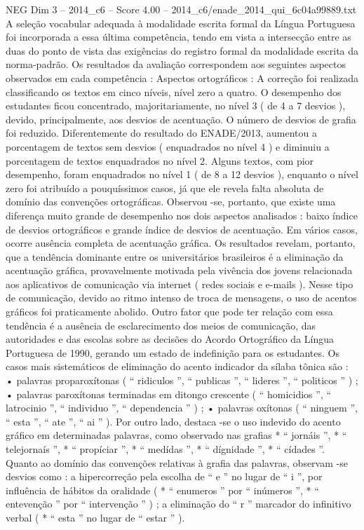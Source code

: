 \begin{textsample}{NEG Dim 3 – 2014\_c6 – Score 4.00 – 2014\_c6/enade\_2014\_qui\_6c04a99889.txt}
A seleção vocabular adequada à modalidade escrita formal da Língua Portuguesa foi incorporada a essa última competência, tendo em vista a intersecção entre as duas do ponto de vista das exigências do registro formal da modalidade escrita da norma-padrão.
Os resultados da avaliação correspondem aos seguintes aspectos observados em cada competência : Aspectos ortográficos : A correção foi realizada classificando os textos em cinco níveis, nível zero a quatro.
O desempenho dos estudantes ficou concentrado, majoritariamente, no nível 3 ( de 4 a 7 desvios ), devido, principalmente, aos desvios de acentuação.
O número de desvios de grafia foi reduzido.
Diferentemente do resultado do ENADE/2013, aumentou a porcentagem de textos sem desvios ( enquadrados no nível 4 ) e diminuiu a porcentagem de textos enquadrados no nível 2.
Alguns textos, com pior desempenho, foram enquadrados no nível 1 ( de 8 a 12 desvios ), enquanto o nível zero foi atribuído a pouquíssimos casos, já que ele revela falta absoluta de domínio das convenções ortográficas.
Observou -se, portanto, que existe uma diferença muito grande de desempenho nos dois aspectos analisados : baixo índice de desvios ortográficos e grande índice de desvios de acentuação.
Em vários casos, ocorre ausência completa de acentuação gráfica.
Os resultados revelam, portanto, que a tendência dominante entre os universitários brasileiros é a eliminação da acentuação gráfica, provavelmente motivada pela vivência dos jovens relacionada aos aplicativos de comunicação via internet ( redes sociais e e-mails ).
Nesse tipo de comunicação, devido ao ritmo intenso de troca de mensagens, o uso de acentos gráficos foi praticamente abolido.
Outro fator que pode ter relação com essa tendência é a ausência de esclarecimento dos meios de comunicação, das autoridades e das escolas sobre as decisões do Acordo Ortográfico da Língua Portuguesa de 1990, gerando um estado de indefinição para os estudantes.
Os casos mais sistemáticos de eliminação do acento indicador da sílaba tônica são : • palavras proparoxítonas ( “ ridiculos ”, “ publicas ”, “ lideres ”, “ politicos ” ) ; • palavras paroxítonas terminadas em ditongo crescente ( “ homicidios ”, “ latrocinio ”, “ individuo ”, “ dependencia ” ) ; • palavras oxítonas ( “ ninguem ”, “ esta ”, “ ate ”, “ ai ” ).
Por outro lado, destaca -se o uso indevido do acento gráfico em determinadas palavras, como observado nas grafias * “ jornáis ”, * “ telejornaís ”, * “ propíciar ”, * “ medídas ”, * “ dígnidade ”, * “ cídades ”.
Quanto ao domínio das convenções relativas à grafia das palavras, observam -se desvios como : a hipercorreção pela escolha de “ e ” no lugar de “ i ”, por influência de hábitos da oralidade ( * “ enumeros ” por “ inúmeros ”, * “ entevenção ” por “ intervenção ” ) ; a eliminação do “ r ” marcador do infinitivo verbal ( * “ esta ” no lugar de “ estar ” ).

\end{textsample}
